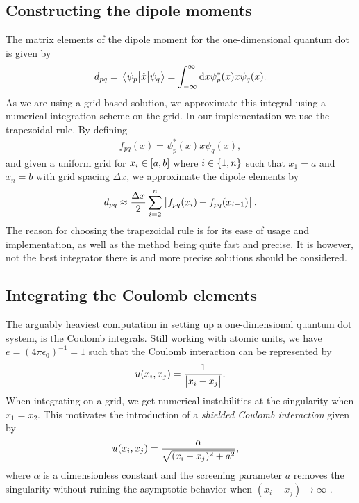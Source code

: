     \subsection{Constructing the dipole moments}
        The matrix elements of the dipole moment for the one-dimensional quantum
        dot is given by
        \begin{align}
            d_{pq}
            = \mel{\psi_{p}}{\hat{x}}{\psi_{q}}
            = \int_{-\infty}^{\infty}\dd x
            \psi^{*}_{p}(x) x \psi_{q}(x).
        \end{align}
        As we are using a grid based solution, we approximate this integral
        using a numerical integration scheme on the grid.
        In our implementation we use the trapezoidal rule.
        By defining
        \begin{align}
            f_{pq}(x) = \psi^{*}_{p}(x) x \psi_{q}(x),
        \end{align}
        and given a uniform grid for $x_i \in \left[ a, b \right]$ where $i \in \left\{ 1,
        n \right\}$ such that $x_1 = a$ and $x_n = b$ with grid spacing $\Delta x$, we
        approximate the dipole elements by
        \begin{align}
            d_{pq}
            \approx
            \frac{\Delta x}{2}\sum_{i = 2}^{n}\left[ 
                f_{pq}(x_{i}) + f_{pq}(x_{i - 1})
             \right].
        \end{align}
        The reason for choosing the trapezoidal rule is for its ease of usage
        and implementation, as well as the method being quite fast and precise.
        It is however, not the best integrator there is and more precise
        solutions should be considered.


    \subsection{Integrating the Coulomb elements}
        The arguably heaviest computation in setting up a one-dimensional
        quantum dot system, is the Coulomb integrals.
        Still working with atomic units, we have $e = (4\pi \epsilon_0)^{-1} =
        1$ such that the Coulomb interaction can be represented by
        \begin{align}
            u(x_i, x_j) = \frac{1}{\abs{x_i - x_j}}.
        \end{align}
        When integrating on a grid, we get numerical instabilities at the
        singularity when $x_1 = x_2$.
        This motivates the introduction of a \emph{shielded Coulomb interaction}
        \cite{suq, skattum2013time, kristiansen2017time} given by
        \begin{align}
            u(x_i, x_j)
            &= \frac{\alpha}{\sqrt{(x_i - x_j)^2 + a^2}},
        \end{align}
        where $\alpha$ is a dimensionless constant and the screening parameter
        $a$ removes the singularity without ruining the asymptotic behavior
        when $(x_i - x_j) \to \infty$ \cite{suq, kristiansen2017time}.

